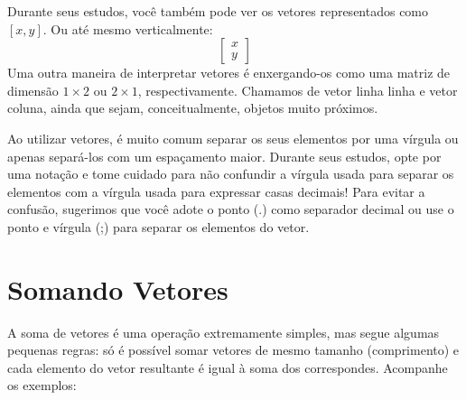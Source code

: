 \documentclass[
  letterpaper,
  DIV=11,
  numbers=noendperiod]{scrreprt}
\begin{document}
Durante seus estudos, você também pode ver os vetores representados como
\([x,y]\). Ou até mesmo verticalmente: \[
\begin{bmatrix}
  x  \\
  y 
\end{bmatrix}
\] Uma outra maneira de interpretar vetores é enxergando-os como uma
matriz de dimensão \(1 \times 2\) ou \(2 \times 1\), respectivamente.
Chamamos de vetor linha linha e vetor coluna, ainda que sejam,
conceitualmente, objetos muito próximos.

Ao utilizar vetores, é muito comum separar os seus elementos por uma
vírgula ou apenas separá-los com um espaçamento maior. Durante seus
estudos, opte por uma notação e tome cuidado para não confundir a
vírgula usada para separar os elementos com a vírgula usada para
expressar casas decimais! Para evitar a confusão, sugerimos que você
adote o ponto (.) como separador decimal ou use o ponto e vírgula (;)
para separar os elementos do vetor.

\section{Somando Vetores}\label{somando-vetores}

A soma de vetores é uma operação extremamente simples, mas segue algumas
pequenas regras: só é possível somar vetores de mesmo tamanho
(comprimento) e cada elemento do vetor resultante é igual à soma dos
correspondes. Acompanhe os exemplos:
\end{document}
